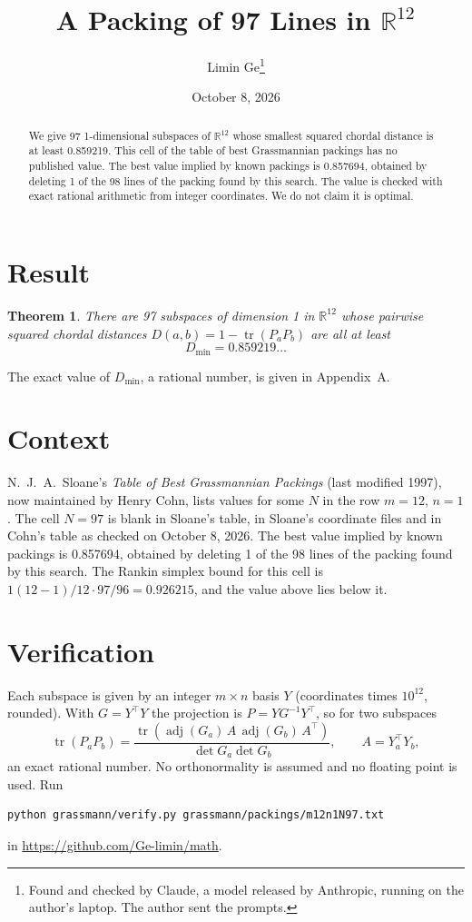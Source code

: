 \documentclass[11pt,a4paper]{article}
\title{A Packing of 97 Lines in $\mathbb{R}^{12}$}
\author{Limin Ge\thanks{Found and checked by Claude, a model released by Anthropic, running on the author's laptop. The author sent the prompts.}}
\date{October 8, 2026}
\newtheorem*{theorem}{Theorem}
\begin{document}
\maketitle
\begin{abstract}
We give 97 1-dimensional subspaces of $\mathbb{R}^{12}$ whose smallest squared chordal distance is at least 0.859219. This cell of the table of best Grassmannian packings has no published value. The best value implied by known packings is 0.857694, obtained by deleting 1 of the 98 lines of the packing found by this search. The value is checked with exact rational arithmetic from integer coordinates. We do not claim it is optimal.
\end{abstract}

\section{Result}
\begin{theorem}
There are 97 subspaces of dimension 1 in $\mathbb{R}^{12}$ whose pairwise squared chordal distances $D(a,b) = 1 - \operatorname{tr}(P_aP_b)$ are all at least
\[ D_{\min} = 0.859219\ldots \]
\end{theorem}
The exact value of $D_{\min}$, a rational number, is given in Appendix~A.


\section{Context}
N.~J.~A.~Sloane's \emph{Table of Best Grassmannian Packings} (last modified 1997), now maintained by Henry Cohn, lists values for some $N$ in the row $m=12$, $n=1$. The cell $N=97$ is blank in Sloane's table, in Sloane's coordinate files and in Cohn's table as checked on October 8, 2026. The best value implied by known packings is 0.857694, obtained by deleting 1 of the 98 lines of the packing found by this search. The Rankin simplex bound for this cell is $1(12-1)/12\cdot 97/96 = 0.926215$, and the value above lies below it.


\section{Verification}
Each subspace is given by an integer $m\times n$ basis $Y$ (coordinates times $10^{12}$, rounded). With $G=Y^\top Y$ the projection is $P=YG^{-1}Y^\top$, so for two subspaces
\[ \operatorname{tr}(P_aP_b)=\frac{\operatorname{tr}(\operatorname{adj}(G_a)\,A\,\operatorname{adj}(G_b)\,A^\top)}{\det G_a\det G_b},\qquad A=Y_a^\top Y_b, \]
an exact rational number. No orthonormality is assumed and no floating point is used. Run
\begin{verbatim}
python grassmann/verify.py grassmann/packings/m12n1N97.txt
\end{verbatim}
in \url{https://github.com/Ge-limin/math}.
\end{document}

